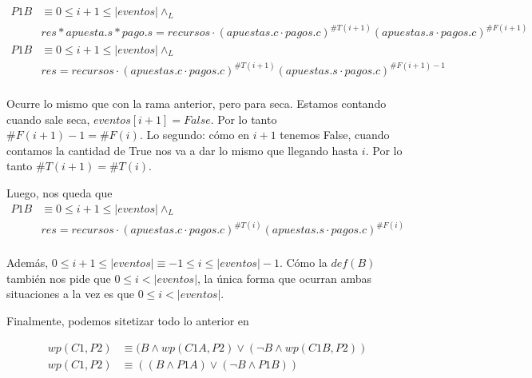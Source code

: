 \documentclass[../document.tex]{subfiles}
\begin{document}
\begin{equation} \label{eq2.b}
\begin{split}
P1B & \equiv 0\leq i+1 \leq |eventos| \land_L \\& res * apuesta.s * pago.s = recursos \cdot (apuestas.c\cdot pagos.c)^{\#T(i+1)}(apuestas.s\cdot pagos.c)^{\#F(i+1)}\\
P1B & \equiv 0\leq i+1 \leq |eventos| \land_L \\& res = recursos \cdot (apuestas.c\cdot pagos.c)^{\#T(i+1)}(apuestas.s\cdot pagos.c)^{\#F(i+1)-1}\\
\end{split}
\end{equation}

Ocurre lo mismo que con la rama anterior, pero para seca.
Estamos contando cuando sale seca, $eventos[i+1] = False$. Por lo tanto $\#F(i+1)-1=\#F(i)$. Lo segundo: cómo en $i+1$ tenemos False, cuando contamos la cantidad de True nos va a dar lo mismo que llegando hasta $i$. Por lo tanto $\#T(i+1)=\#T(i)$.

Luego, nos queda que
\begin{equation}
    \begin{split}
    P1B & \equiv 0\leq i+1 \leq |eventos| \land_L \\& res = recursos \cdot (apuestas.c\cdot pagos.c)^{\#T(i)}(apuestas.s\cdot pagos.c)^{\#F(i)}\\
    \end{split}
\end{equation}

Además, $0\leq i+1 \leq |eventos| \equiv -1\leq i \leq |eventos|-1$. Cómo la $def(B)$ también nos pide que $0 \leq i < |eventos|$, la única forma que ocurran ambas situaciones a la vez es que $0\leq i < |eventos|$.

Finalmente, podemos sitetizar todo lo anterior en

\begin{equation} \label{final}
\begin{split}
    wp(C1,P2) &\equiv (B \land wp(C1A, P2) \lor (\neg B \land wp(C1B, P2))\\
    wp(C1,P2) &\equiv ((B \land P1A) \lor (\neg B \land P1B))\\
\end{split}
\end{equation}
\end{document}
